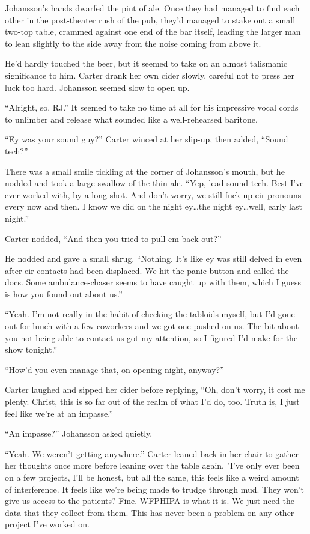 Johansson's hands dwarfed the pint of ale. Once they had managed to find each other in the post-theater rush of the pub, they'd managed to stake out a small two-top table, crammed against one end of the bar itself, leading the larger man to lean slightly to the side away from the noise coming from above it.

He'd hardly touched the beer, but it seemed to take on an almost talismanic significance to him. Carter drank her own cider slowly, careful not to press her luck too hard. Johansson seemed slow to open up.

``Alright, so, RJ.'' It seemed to take no time at all for his impressive vocal cords to unlimber and release what sounded like a well-rehearsed baritone.

``Ey was your sound guy?'' Carter winced at her slip-up, then added, ``Sound tech?''

There was a small smile tickling at the corner of Johansson's mouth, but he nodded and took a large swallow of the thin ale. ``Yep, lead sound tech. Best I've ever worked with, by a long shot. And don't worry, we still fuck up eir pronouns every now and then. I know we did on the night ey\ldots{}the night ey\ldots{}well, early last night.''

Carter nodded, ``And then you tried to pull em back out?''

He nodded and gave a small shrug. ``Nothing. It's like ey was still delved in even after eir contacts had been displaced. We hit the panic button and called the docs. Some ambulance-chaser seems to have caught up with them, which I guess is how you found out about us.''

``Yeah. I'm not really in the habit of checking the tabloids myself, but I'd gone out for lunch with a few coworkers and we got one pushed on us. The bit about you not being able to contact us got my attention, so I figured I'd make for the show tonight.''

``How'd you even manage that, on opening night, anyway?''

Carter laughed and sipped her cider before replying, ``Oh, don't worry, it cost me plenty. Christ, this is so far out of the realm of what I'd do, too. Truth is, I just feel like we're at an impasse.''

``An impasse?'' Johansson asked quietly.

``Yeah. We weren't getting anywhere.'' Carter leaned back in her chair to gather her thoughts once more before leaning over the table again. "I've only ever been on a few projects, I'll be honest, but all the same, this feels like a weird amount of interference. It feels like we're being made to trudge through mud. They won't give us access to the patients? Fine. WFPHIPA is what it is. We just need the data that they collect from them. This has never been a problem on any other project I've worked on.


